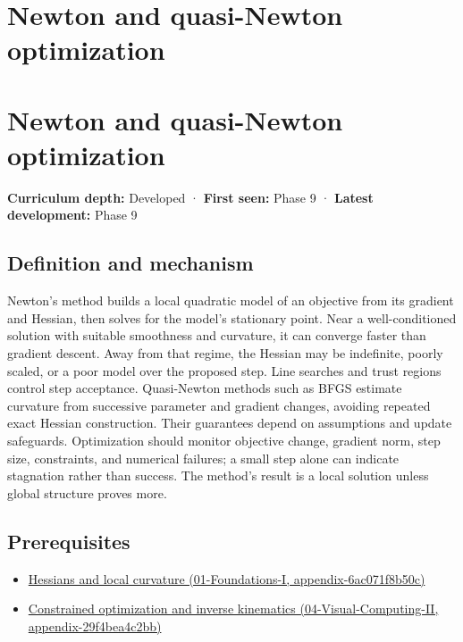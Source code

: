 \hypertarget{appendix-54c8f5828387}{}
\section*{Newton and quasi-Newton optimization}
\section{Newton and quasi-Newton optimization}\label{appendix-54c8f5828387-newton-and-quasi-newton-optimization}

\textbf{Curriculum depth:} Developed · \textbf{First seen:} Phase 9 · \textbf{Latest development:} Phase 9

\subsection{Definition and mechanism}\label{appendix-54c8f5828387-definition-and-mechanism}

Newton's method builds a local quadratic model of an objective from its gradient and Hessian, then solves for the model's stationary point. Near a well-conditioned solution with suitable smoothness and curvature, it can converge faster than gradient descent. Away from that regime, the Hessian may be indefinite, poorly scaled, or a poor model over the proposed step. Line searches and trust regions control step acceptance. Quasi-Newton methods such as BFGS estimate curvature from successive parameter and gradient changes, avoiding repeated exact Hessian construction. Their guarantees depend on assumptions and update safeguards. Optimization should monitor objective change, gradient norm, step size, constraints, and numerical failures; a small step alone can indicate stagnation rather than success. The method's result is a local solution unless global structure proves more.

\subsection{Prerequisites}\label{appendix-54c8f5828387-prerequisites}

\begin{itemize}
\tightlist
\item
  \href{../01-Foundations-I/main.pdf\#nameddest=appendix-6ac071f8b50c}{Hessians and local curvature (01-Foundations-I, appendix-6ac071f8b50c)}
\item
  \href{../04-Visual-Computing-II/main.pdf\#nameddest=appendix-29f4bea4c2bb}{Constrained optimization and inverse kinematics (04-Visual-Computing-II, appendix-29f4bea4c2bb)}
\end{itemize}

